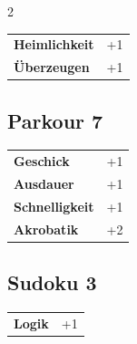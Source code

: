 \begin{multicols}{2}
\begin{tcolorbox}
\begin{tabular}{@{}ll@{}}
    \textbf{Heimlichkeit} & +1\\
    \textbf{Überzeugen} & +1\\
\end{tabular}


\end{tcolorbox}

\begin{tcolorbox}
    \subsection*{Parkour \hfill \small{7 }}
    \tcblower




\begin{tabular}{@{}ll@{}}
    \textbf{Geschick} & +1\\
    \textbf{Ausdauer} & +1\\
    \textbf{Schnelligkeit} & +1\\
    \textbf{Akrobatik} & +2\\
\end{tabular}


\end{tcolorbox}

\begin{tcolorbox}
    \subsection*{Sudoku \hfill \small{3 }}
    \tcblower




\begin{tabular}{@{}ll@{}}
    \textbf{Logik} & +1\\
\end{tabular}



\end{tcolorbox}
\end{multicols}
